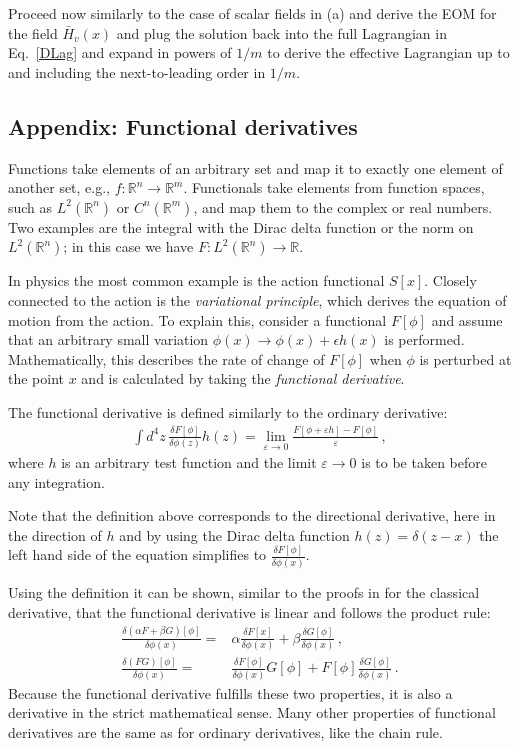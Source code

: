 \documentclass[11pt]{latex/exercise}
\begin{document}
Proceed now similarly to the case of scalar fields in (a) and derive the EOM for the field $\bar H_v(x)$ and plug the solution back into the full Lagrangian in Eq.~\eqref{DLag} and expand in powers of
$1/m$ to derive the effective Lagrangian up to and including the next-to-leading order in $1/m$.


\subsection*{Appendix: Functional derivatives}
\label{A:1}
Functions take elements of an arbitrary set and map it to exactly one element of another set, e.g., $f\colon \mathbb{R}^n \rightarrow \mathbb{R}^m$.
Functionals take elements from function spaces, such as $L^2(\mathbb{R}^n)$ or $C^n(\mathbb{R}^m)$, and map them to the complex or real numbers.
Two examples are the integral with the Dirac delta function or the norm on $L^2(\mathbb{R}^n)$;
in this case we have $F\colon L^2(\mathbb{R}^n)\to \mathbb{R}$.

In physics the most common example is the action functional $S[x]$.
Closely connected to the action is the \emph{variational principle}, which derives the equation of motion from the action.
To explain this, consider a functional $F[\phi]$ and assume that an arbitrary small variation $\phi(x) \to \phi(x) + \epsilon h(x)$ is performed.
Mathematically, this describes the rate of change of $F[\phi]$ when $\phi$ is perturbed at the point $x$ and is calculated by taking the \emph{functional derivative}.

The functional derivative is defined similarly to the ordinary derivative:
\begin{align}
    \int d^4 z\, \frac{\delta F[\phi]}{\delta \phi(z)} h(z)
    =
    \lim \limits_{\varepsilon \rightarrow 0}\frac{F[\phi+\varepsilon h]-F[\phi]}{\varepsilon}\,,
\end{align}
where $h$ is an arbitrary test function and the limit $\varepsilon \to 0 $ is to be taken before any integration.

Note that the definition above corresponds to the directional derivative, here in the direction of $h$ and by using the Dirac delta function
$h(z)=\delta(z-x)$
the left hand side of the equation simplifies to
$\frac{\delta F[\phi]}{\delta \phi(x)}$.

Using the definition it can be shown, similar to the proofs in for the classical derivative, that the functional derivative is linear and follows the product rule:
\begin{align}
    \frac{\delta(\alpha F+\beta G)[\phi]}{\delta \phi(x)}
    ={} &
    \alpha \frac{\delta F[x]}{\delta \phi(x)}+\beta \frac{\delta G[\phi]}{\delta \phi(x)}\,,
    \\
    \frac{\delta( F G)[\phi]}{\delta \phi(x)}
    ={} &
    \frac{\delta F[\phi]}{\delta \phi(x)}G[\phi]+ F[\phi]\frac{\delta G[\phi]}{\delta \phi(x)}\,.
\end{align}
Because the functional derivative fulfills these two properties, it is also a derivative in the strict mathematical sense.
Many other properties of functional derivatives are the same as for ordinary derivatives, like the chain rule.
\end{document}
